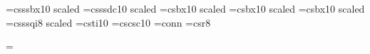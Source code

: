 %
%
%
\chyph  %
%
\raggedbottom   %

\font\ftitul=csssbx10 scaled 
\font\fautor=csssdc10 scaled 
\font\bbf=csbx10 scaled 
\font\bmf=csbx10 scaled 
\font\fsec=csbx10 scaled 
\font\fuvnap=csssqi8 scaled 
\font\fuvtext=csti10
\font\sc=cscsc10
\font\consym=conn
\font\eightrm=csr8


\newcount\kapnum	%
\newcount\secnum	%
\newread\test
\newwrite\toc

\def\newpage{\par\vfill\penalty-10000\break}


\def\softinput#1{\immediate\openin\test=#1
	\ifeof\test\message{Varování: soubor #1 nebyl nalezen. Spustťě ještě jednou}%
	  \else\immediate\closein\test\fi}


\def\writetoc#1#2{}
\def\maketoc{\immediate\openout\toc=\jobname.toc
       \def\writetoc##1##2{\write\toc{\string\tocline{\string##1}%
                {##2}{\the\pageno}}}}
\output={\lineskiplimit=0pt \plainoutput} %
\def\heretoc{\baselineskip=16pt \lineskiplimit=-\maxdimen
      \leftline{\bbf \vrule height 18pt width 0pt Obsah}\nobreak\vskip 8pt
      \softinput{\jobname.toc}\par \kapnum=0}
\def\tocline#1{#1}
\def\rdotfill{\leaders\hbox to 5pt{\hss.\hss}\hfill}
\def\tkap#1#2{\advance\kapnum by 1
	      \secnum=0
	      \line{\hbox to 1.5em{\hfil\bf\the\kapnum. }
	      #1\unskip\rdotfill\ #2}}
\def\tsec#1#2{\advance\secnum by 1
              \line{\hbox to 40pt{\hfil\bf\the\kapnum.\the\secnum\ }
               #1\unskip\rdotfill\ #2}}

\def\chapter#1{\newpage
		 \advance\kapnum by 1
		 \secnum=0
		 \leftline{\bmf \the\kapnum. #1}
		 \vskip 5pt
		 \writetoc\tkap{#1}\par	
               }

